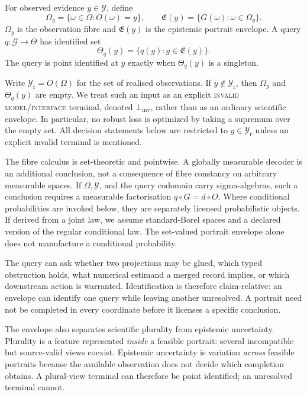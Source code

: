 \begin{definition}
For observed evidence $y\in\mathcal Y$, define
\begin{equation}
  \Omega_y=\{\omega\in\Omega:O(\omega)=y\},\qquad
  \mathfrak E(y)=\{G(\omega):\omega\in\Omega_y\}.
\end{equation}
$\Omega_y$ is the observation fibre and $\mathfrak E(y)$ is the epistemic
portrait envelope. A query $q:\mathcal G\to\Theta$ has identified set
\begin{equation}
  \Theta_q(y)=\{q(g):g\in\mathfrak E(y)\}.
\end{equation}
The query is point identified at $y$ exactly when $\Theta_q(y)$ is a
singleton.
\end{definition}

Write $\mathcal Y_{\mathrm r}=O(\Omega)$ for the set of realised
observations. If $y\notin\mathcal Y_{\mathrm r}$, then $\Omega_y$ and
$\Theta_q(y)$ are empty. We treat such an input as an explicit
\textsc{invalid model/interface} terminal, denoted $\bot_{\mathrm{inv}}$,
rather than as an ordinary scientific envelope. In particular, no robust loss
is optimized by taking a supremum over the empty set. All decision statements
below are restricted to $y\in\mathcal Y_{\mathrm r}$ unless an explicit
invalid terminal is mentioned.

The fibre calculus is set-theoretic and pointwise. A globally measurable
decoder is an additional conclusion, not a consequence of fibre constancy on
arbitrary measurable spaces. If $\Omega,\mathcal Y$, and the query codomain
carry sigma-algebras, such a conclusion requires a measurable factorisation
$q\circ G=d\circ O$. Where conditional probabilities are invoked below, they
are separately licensed probabilistic objects. If derived from a joint law,
we assume standard-Borel spaces and a declared version of the regular
conditional law. The set-valued portrait envelope alone does not manufacture
a conditional probability.

The query can ask whether two projections may be glued, which typed
obstruction holds, what numerical estimand a merged record implies, or which
downstream action is warranted. Identification is therefore claim-relative:
an envelope can identify one query while leaving another unresolved. A
portrait need not be completed in every coordinate before it licenses a
specific conclusion.

The envelope also separates scientific plurality from epistemic uncertainty.
Plurality is a feature represented \emph{inside} a feasible portrait: several
incompatible but source-valid views coexist. Epistemic uncertainty is
variation \emph{across} feasible portraits because the available observation
does not decide which completion obtains. A plural-view terminal can therefore
be point identified; an unresolved terminal cannot.

